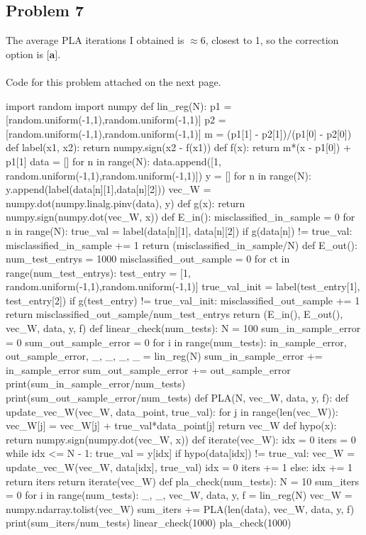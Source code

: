 \documentclass{article}
\begin{document}
\subsection*{Problem 7}
The average PLA iterations I obtained is $\approx 6$, closest to 1, so the correction option is $\textbf{[a]}$.  \\\\
Code for this problem attached on the next page.
\newpage
\begin{python}
import random
import numpy
def lin_reg(N):
    p1 = [random.uniform(-1,1),random.uniform(-1,1)]
    p2 = [random.uniform(-1,1),random.uniform(-1,1)]
    m = (p1[1] - p2[1])/(p1[0] - p2[0])
    def label(x1, x2):
        return numpy.sign(x2 - f(x1))
    def f(x): 
        return m*(x - p1[0]) + p1[1]
    data = []
    for n in range(N):
        data.append([1, random.uniform(-1,1),random.uniform(-1,1)])
    y = []
    for n in range(N):
        y.append(label(data[n][1],data[n][2]))
    vec_W = numpy.dot(numpy.linalg.pinv(data), y)
    def g(x):
        return numpy.sign(numpy.dot(vec_W, x))
    def E_in():
        misclassified_in_sample = 0
        for n in range(N):
            true_val = label(data[n][1], data[n][2])
            if g(data[n]) != true_val:
                misclassified_in_sample += 1
        return (misclassified_in_sample/N)
    def E_out():
        num_test_entrys = 1000 
        misclassified_out_sample = 0
        for ct in range(num_test_entrys):
            test_entry = [1, random.uniform(-1,1),random.uniform(-1,1)]
            true_val_init = label(test_entry[1], test_entry[2])
            if g(test_entry) != true_val_init:
                misclassified_out_sample += 1
        return misclassified_out_sample/num_test_entrys
    return (E_in(), E_out(), vec_W, data, y, f)
def linear_check(num_tests):
    N = 100
    sum_in_sample_error = 0
    sum_out_sample_error = 0
    for i in range(num_tests):
        in_sample_error, out_sample_error, _, _, _, _ = lin_reg(N)
        sum_in_sample_error += in_sample_error
        sum_out_sample_error += out_sample_error
    print(sum_in_sample_error/num_tests)
    print(sum_out_sample_error/num_tests)
def PLA(N, vec_W, data, y, f):
    def update_vec_W(vec_W, data_point, true_val):
        for j in range(len(vec_W)):
            vec_W[j] = vec_W[j] + true_val*data_point[j]
        return vec_W
    def hypo(x):
        return numpy.sign(numpy.dot(vec_W, x))
    def iterate(vec_W):
        idx = 0
        iters = 0
        while idx <= N - 1:
            true_val = y[idx]
            if hypo(data[idx]) != true_val:
                vec_W = update_vec_W(vec_W, data[idx], true_val)
                idx = 0
                iters += 1
            else:
                idx += 1
        return iters
    return iterate(vec_W)
def pla_check(num_tests):
    N = 10
    sum_iters = 0
    for i in range(num_tests):
        _, _, vec_W, data, y, f = lin_reg(N)
        vec_W = numpy.ndarray.tolist(vec_W)
        sum_iters += PLA(len(data), vec_W, data, y, f)
    print(sum_iters/num_tests)
linear_check(1000)
pla_check(1000)
\end{python}
\end{document}
